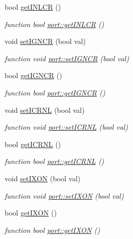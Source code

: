 \begin{DoxyCompactItemize}
bool \hyperlink{classport_a263aa63cc21b4966106d954a4bea63fa}{get\+I\+N\+L\+CR} ()
\begin{DoxyCompactList}\small\item\em function bool \hyperlink{classport_a263aa63cc21b4966106d954a4bea63fa}{port\+::get\+I\+N\+L\+CR} () \end{DoxyCompactList}\item 
void \hyperlink{classport_ad79cac75e27d960cabe7a06572b7b1a0}{set\+I\+G\+N\+CR} (bool val)
\begin{DoxyCompactList}\small\item\em function void \hyperlink{classport_ad79cac75e27d960cabe7a06572b7b1a0}{port\+::set\+I\+G\+N\+CR} (bool val) \end{DoxyCompactList}\item 
bool \hyperlink{classport_a9c489a19354c6d711755d54664d2f701}{get\+I\+G\+N\+CR} ()
\begin{DoxyCompactList}\small\item\em function bool \hyperlink{classport_a9c489a19354c6d711755d54664d2f701}{port\+::get\+I\+G\+N\+CR} () \end{DoxyCompactList}\item 
void \hyperlink{classport_a5087059119c84da88e99145604a8ebf5}{set\+I\+C\+R\+NL} (bool val)
\begin{DoxyCompactList}\small\item\em function void \hyperlink{classport_a5087059119c84da88e99145604a8ebf5}{port\+::set\+I\+C\+R\+NL} (bool val) \end{DoxyCompactList}\item 
bool \hyperlink{classport_a3024c478a8a7f754e5eb2b50ff733b81}{get\+I\+C\+R\+NL} ()
\begin{DoxyCompactList}\small\item\em function bool \hyperlink{classport_a3024c478a8a7f754e5eb2b50ff733b81}{port\+::get\+I\+C\+R\+NL} () \end{DoxyCompactList}\item 
void \hyperlink{classport_a05f341eef4091a50c0fdb6742ba5e9cf}{set\+I\+X\+ON} (bool val)
\begin{DoxyCompactList}\small\item\em function void \hyperlink{classport_a05f341eef4091a50c0fdb6742ba5e9cf}{port\+::set\+I\+X\+ON} (bool val) \end{DoxyCompactList}\item 
bool \hyperlink{classport_ab57c3459ef2ee5d76b6e996f46b66bcc}{get\+I\+X\+ON} ()
\begin{DoxyCompactList}\small\item\em function bool \hyperlink{classport_ab57c3459ef2ee5d76b6e996f46b66bcc}{port\+::get\+I\+X\+ON} () \end{DoxyCompactList}\item 

\end{DoxyCompactItemize}

